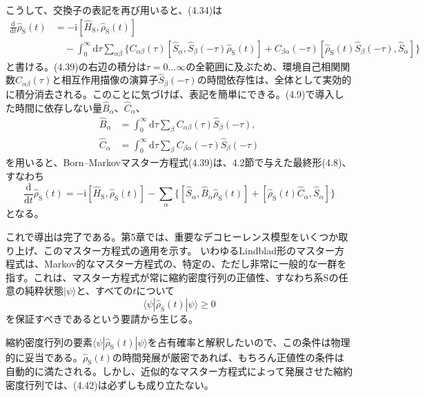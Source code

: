\hypertarget{srcpage:165}{}\label{srcpage:165}
こうして、交換子の表記を再び用いると、(4.34)は
\begin{equation}
\begin{aligned}
\frac{\mathrm d}{\mathrm dt}\hat\rho_{\mathrm S}(t)
&=-\mathrm i[\hat H_{\mathrm S},\hat\rho_{\mathrm S}(t)]\\
&\quad-\int_0^\infty\mathrm d\tau\sum_{\alpha\beta}\big\{
C_{\alpha\beta}(\tau)[\hat S_\alpha,\hat S_\beta(-\tau)\hat\rho_{\mathrm S}(t)]
+C_{\beta\alpha}(-\tau)[\hat\rho_{\mathrm S}(t)\hat S_\beta(-\tau),\hat S_\alpha]\big\}
\end{aligned}\tag{4.39}
\end{equation}
と書ける。(4.39)の右辺の積分は$\tau=0\ldots\infty$の全範囲に及ぶため、環境自己相関関数$C_{\alpha\beta}(\tau)$と相互作用描像の演算子$\hat S_\beta(-\tau)$の時間依存性は、全体として実効的に積分消去される。このことに気づけば、表記を簡単にできる。(4.9)で導入した時間に依存しない量$\hat B_\alpha$、$\hat C_\alpha$、
\begin{align}
\hat B_\alpha&=\int_0^\infty\mathrm d\tau\sum_\beta C_{\alpha\beta}(\tau)\hat S_\beta(-\tau),\tag{4.40a}\\
\hat C_\alpha&=\int_0^\infty\mathrm d\tau\sum_\beta C_{\beta\alpha}(-\tau)\hat S_\beta(-\tau)\tag{4.40b}
\end{align}
を用いると、Born--Markovマスター方程式(4.39)は、4.2節で与えた最終形(4.8)、すなわち
\begin{equation}
\frac{\mathrm d}{\mathrm dt}\hat\rho_{\mathrm S}(t)=-\mathrm i[\hat H_{\mathrm S},\hat\rho_{\mathrm S}(t)]
-\sum_\alpha\big\{[\hat S_\alpha,\hat B_\alpha\hat\rho_{\mathrm S}(t)]+[\hat\rho_{\mathrm S}(t)\hat C_\alpha,\hat S_\alpha]\big\}
\tag{4.41}
\end{equation}
となる。

これで導出は完了である。第5章では、重要なデコヒーレンス模型をいくつか取り上げ、このマスター方程式の適用を示す。
いわゆるLindblad形のマスター方程式は、Markov的なマスター方程式の、特定の、ただし非常に一般的な一群を指す。これは、マスター方程式が常に縮約密度行列の正値性、すなわち系Sの任意の純粋状態$|\psi\rangle$と、すべての$t$について
\begin{equation}
\langle\psi|\hat\rho_{\mathrm S}(t)|\psi\rangle\geq0
\tag{4.42}
\end{equation}
を保証すべきであるという要請から生じる。

\hypertarget{srcpage:166}{}\label{srcpage:166}
縮約密度行列の要素$\langle\psi|\hat\rho_{\mathrm S}(t)|\psi\rangle$を占有確率と解釈したいので、この条件は物理的に妥当である。$\hat\rho_{\mathrm S}(t)$の時間発展が厳密であれば、もちろん正値性の条件は自動的に満たされる。しかし、近似的なマスター方程式によって発展させた縮約密度行列では、(4.42)は必ずしも成り立たない。

